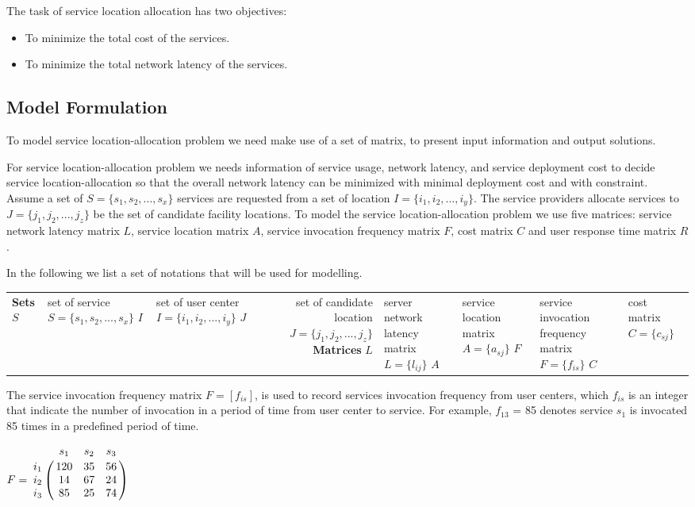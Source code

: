 \documentclass{llncs}
\let\bbordermatrix\bordermatrix
\begin{document}
The task of service location allocation has two objectives:
\begin{itemize}
	\item To minimize the total cost of the services.
	\item To minimize the total network latency of the services.
\end{itemize}


\subsection{Model Formulation}
To model service location-allocation problem we need make use of a set of matrix, to present input information and output solutions. 

For service location-allocation problem we needs information of service usage, network latency, and service deployment cost to decide service location-allocation so that the overall network latency can be minimized with minimal deployment cost and with constraint.
Assume a set of $S = \{ s_{1}, s_{2}, ..., s_{x}\}$ services are
requested from a set of location $I = \{ i_{1}, i_{2}, ..., i_{y} \}$. The service providers allocate services 
to $J = \{ j_{1}, j_{2}, ..., j_{z} \}$ be the set of candidate facility locations.
To model the service location-allocation problem we use five matrices: 
service network latency matrix $L$, service location
matrix $A$, service invocation frequency matrix $F$, cost matrix $C$ and user response time matrix $R$.

In the following we list a set of notations that will be used for modelling. 
\begin{center}
	\begin{tabular}{l*{2}{l}r}
		\hline
		\textbf{Sets} \cr
		$S$	& set of service $S = \{s_{1}, s_{2}, ..., s_{x}\}$ \cr
		$I$	& set of user center $I = \{i_{1}, i_{2}, ..., i_{y}\}$ \cr
		$J$	& set of candidate location $J = \{j_{1}, j_{2}, ..., j_{z}\}$ \cr
		\textbf{Matrices} \cr
		$L$ & server network latency matrix $L = \{l_{ij}\}$ \cr
		$A$ & service location matrix $A = \{a_{sj}\}$ \cr
		$F$ & service invocation frequency matrix $F = \{f_{is}\}$ \cr
		$C$ & cost matrix $C = \{c_{sj}\}$ \cr
		\hline
	\end{tabular}
\end{center}
The service invocation frequency matrix $F= [f_{is}]$, is used to record services invocation frequency from user centers, 
which $f_{is}$ is an integer that indicate the number of invocation in a period of time from user center to service. 
For example, $f_{13}$ = 85 denotes service $s_{1}$ is invocated 85 times in a predefined period of time.
\begin{center}
$
F = \bbordermatrix{~ & s_{1} & s_{2} & s_{3}  \cr
					i_{1}	&120 &35 &56	\cr
					i_{2}	&14  &67 &24 \cr
					i_{3}	&85 &25 &74 \cr}
$
\end{center}
\end{document}
